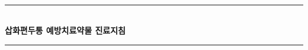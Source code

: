 \documentclass[12pt]{article} %
\begin{document}

\begin{titlepage}

\newcommand{\HRule}{\rule{\linewidth}{0.5mm}} %

\center %

\textsc{}\\[1.5cm] %

\HRule \\[0.4cm]
{ \huge \bfseries 삽화편두통 예방치료약물 진료지침}\\[0.4cm] %
\HRule \\[1.5cm]


\end{titlepage}
\end{document}
